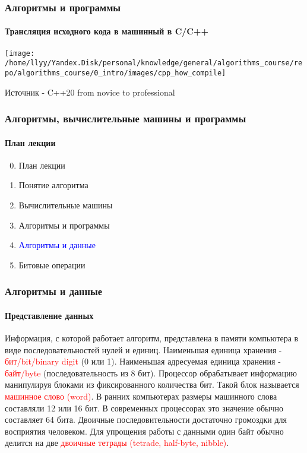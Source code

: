 \documentclass[aspectratio=169]{beamer}
\begin{document}
\begin{frame}
\frametitle{Алгоритмы и программы}
\framesubtitle{Трансляция исходного кода в машинный в C/C++}
\justifying
\small
\centering
\texttt{[image: /home/llyy/Yandex.Disk/personal/knowledge/general/algorithms\_course/repo/algorithms\_course/0\_intro/images/cpp\_how\_compile]}

\scriptsize Источник - C++20 from novice to professional
\end{frame}

\begin{frame}
\frametitle{Алгоритмы, вычислительные машины и программы}
\framesubtitle{План лекции}

\begin{enumerate}
  \setcounter{enumi}{-1}
  \item{План лекции}
  \item{Понятие алгоритма}
  \item{Вычислительные машины}
  \item{Алгоритмы и программы}
  \item{\textcolor{blue}{Алгоритмы и данные}}
  \item{Битовые операции}

\end{enumerate}
\end{frame}

\begin{frame}
\frametitle{Алгоритмы и данные}
\framesubtitle{Представление данных}
\justifying
\small

Информация, с которой работает алгоритм, представлена в памяти компьютера в виде последовательностей нулей и единиц. \newline\newline Наименьшая единица хранения - \textcolor{red}{бит/bit/binary digit} (0 или 1). \newline Наименьшая адресуемая единица хранения - \textcolor{red}{байт/byte} (последовательность из 8 бит).\newline\newline
Процессор обрабатывает информацию манипулируя блоками из фиксированного количества бит. Такой блок называется \textcolor{red}{машинное слово (word)}. В ранних компьютерах размеры машинного слова составляли 12 или 16 бит. В современных процессорах это значение обычно составляет 64 бита.\newline\newline
Двоичные последовительности достаточно громоздки для восприятия человеком. Для упрощения работы с данными один байт обычно делится на две \textcolor{red}{двоичные тетрады (tetrade, half-byte, nibble)}.

\end{frame}
\end{document}
